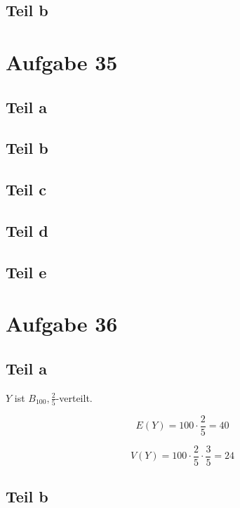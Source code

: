 \documentclass[10pt,a4paper]{article}
\begin{document}
\subsection{Teil b}

\section{Aufgabe 35}

\subsection{Teil a}

\subsection{Teil b}

\subsection{Teil c}

\subsection{Teil d}

\subsection{Teil e}

\section{Aufgabe 36}

\subsection{Teil a}

$Y$ ist $B_{100}, \frac{2}{5}$-verteilt.

\begin{equation}
  E(Y) = 100 \cdot \frac{2}{5} = 40
\end{equation}

\begin{equation}
  V(Y) = 100 \cdot \frac{2}{5} \cdot \frac{3}{5} = 24
\end{equation}

\subsection{Teil b}
\end{document}
